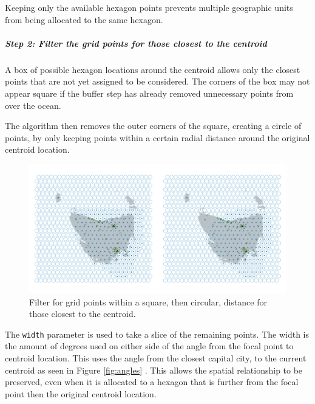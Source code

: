 \documentclass{monashthesis}
\begin{document}
Keeping only the available hexagon points prevents multiple geographic units from being allocated to the same hexagon.

\hypertarget{step-2-filter-the-grid-points-for-those-closest-to-the-centroid}{%
\subparagraph{Step 2: Filter the grid points for those closest to the centroid}\label{step-2-filter-the-grid-points-for-those-closest-to-the-centroid}}

A box of possible hexagon locations around the centroid allows only the closest points that are not yet assigned to be considered. The corners of the box may not appear square if the buffer step has already removed unnecessary points from over the ocean.

The algorithm then removes the outer corners of the square, creating a circle of points, by only keeping points within a certain radial distance around the original centroid location.

\begin{figure}[H]
\centering
\includegraphics[width=14cm]{figures/03-algorithm/4grid.png}
\caption{\label{fig:buffers}Filter for grid points within a square, then circular, distance for those closest to the centroid.}
\end{figure}

The \texttt{width} parameter is used to take a slice of the remaining points. The width is the amount of degrees used on either side of the angle from the focal point to centroid location. This uses the angle from the closest capital city, to the current centroid as seen in Figure \ref{fig:angles} . This allows the spatial relationship to be preserved, even when it is allocated to a hexagon that is further from the focal point then the original centroid location.
\end{document}
